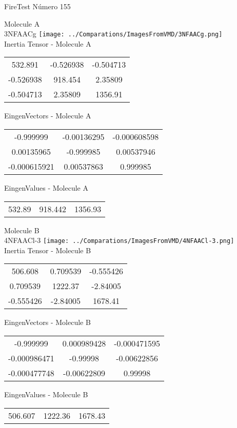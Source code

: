\vtab[-2cm]
\begin{center}
{\large FireTest \tab Número 155}
\end{center}
\begin{multicols}{2}
\begin{center}

Molecule A \\ 
3NFAACg
\texttt{[image: ../Comparations/ImagesFromVMD/3NFAACg.png]}
\\
Inertia Tensor - Molecule A \\
\vtab

\begin{tabular}{|c c c|}
532.891	 & 	-0.526938	 & 	-0.504713	 \\
-0.526938	 & 	918.454	 & 	2.35809	 \\
-0.504713	 & 	2.35809	 & 	1356.91
\end{tabular}

\vtab
 EingenVectors - Molecule A     \\
\vtab
\begin{tabular}{|c c c|}
-0.999999	 & 	-0.00136295	 & 	-0.000608598	 \\
0.00135965	 & 	-0.999985	 & 	0.00537946	 \\
-0.000615921	 & 	0.00537863	 & 	0.999985
\end{tabular}

\vtab
 EingenValues - Molecule A     \\
\vtab
\begin{tabular}{|c c c|}
532.89	 & 	918.442	 & 	1356.93	 \\
\end{tabular}
\columnbreak

Molecule B \\ 
4NFAACl-3
\texttt{[image: ../Comparations/ImagesFromVMD/4NFAACl-3.png]}
\\
Inertia Tensor - Molecule B \\
\vtab

\begin{tabular}{|c c c|}
506.608	 & 	0.709539	 & 	-0.555426	 \\
0.709539	 & 	1222.37	 & 	-2.84005	 \\
-0.555426	 & 	-2.84005	 & 	1678.41
\end{tabular}

\vtab
 EingenVectors - Molecule B     \\
\vtab
\begin{tabular}{|c c c|}
-0.999999	 & 	0.000989428	 & 	-0.000471595	 \\
-0.000986471	 & 	-0.99998	 & 	-0.00622856	 \\
-0.000477748	 & 	-0.00622809	 & 	0.99998
\end{tabular}

\vtab
 EingenValues - Molecule B     \\
\vtab
\begin{tabular}{|c c c|}
506.607	 & 	1222.36	 & 	1678.43	 \\
\end{tabular}

\end{center}
\end{multicols}

